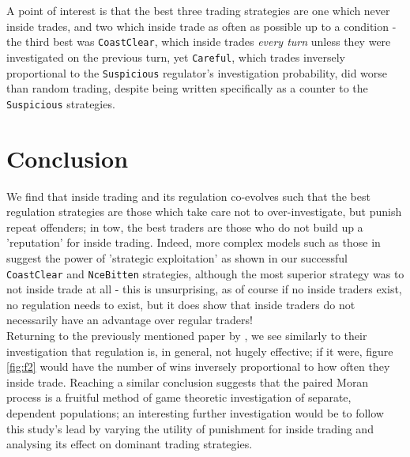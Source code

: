 \documentclass{article}
\begin{document}
A point of interest is that the best three trading strategies are one which never inside trades, and two which inside trade as often as possible up to a condition - the third best was \texttt{CoastClear}, which inside trades \emph{every turn} unless they were investigated on the previous turn, yet \texttt{Careful}, which trades inversely proportional to the \texttt{Suspicious} regulator's investigation probability, did worse than random trading, despite being written specifically as a counter to the \texttt{Suspicious} strategies.

\section{Conclusion}
We find that inside trading and its regulation co-evolves such that the best regulation strategies are those which take care not to over-investigate, but punish repeat offenders; in tow, the best traders are those who do not build up a 'reputation' for inside trading. Indeed, more complex models such as those in \citet{kyle1985continuous} suggest the power of 'strategic exploitation' as shown in our successful \texttt{CoastClear} and \texttt{NceBitten} strategies, although the most superior strategy was to not inside trade at all - this is unsurprising, as of course if no inside traders exist, no regulation needs to exist, but it does show that inside traders do not necessarily have an advantage over regular traders!
\\

Returning to the previously mentioned paper by \citet{smales2017game}, we see similarly to their investigation that regulation is, in general, not hugely effective; if it were, figure \ref{fig:f2} would have the number of wins inversely proportional to how often they inside trade. Reaching a similar conclusion suggests that the paired Moran process is a fruitful method of game theoretic investigation of separate, dependent populations; an interesting further investigation would be to follow this study's lead by varying the utility of punishment for inside trading and analysing its effect on dominant trading strategies.

\end{document}
